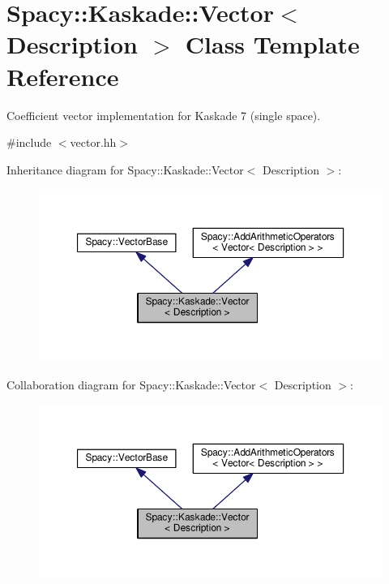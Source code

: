 \hypertarget{classSpacy_1_1Kaskade_1_1Vector}{}\section{Spacy\+:\+:Kaskade\+:\+:Vector$<$ Description $>$ Class Template Reference}
\label{classSpacy_1_1Kaskade_1_1Vector}


Coefficient vector implementation for Kaskade 7 (single space).  




{\ttfamily \#include $<$vector.\+hh$>$}



Inheritance diagram for Spacy\+:\+:Kaskade\+:\+:Vector$<$ Description $>$\+:
\nopagebreak
\begin{figure}[H]
\begin{center}
\leavevmode
\includegraphics[width=350pt]{classSpacy_1_1Kaskade_1_1Vector__inherit__graph}
\end{center}
\end{figure}


Collaboration diagram for Spacy\+:\+:Kaskade\+:\+:Vector$<$ Description $>$\+:
\nopagebreak
\begin{figure}[H]
\begin{center}
\leavevmode
\includegraphics[width=350pt]{classSpacy_1_1Kaskade_1_1Vector__coll__graph}
\end{center}
\end{figure}
